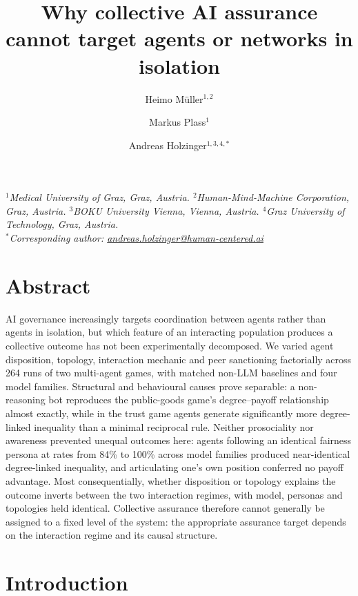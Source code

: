 \documentclass[11pt,a4paper]{article}
\title{\bfseries Why collective AI assurance cannot target agents or networks in isolation}
\author{Heimo M\"uller$^{1,2}$ \and Markus Plass$^{1}$ \and
Andreas Holzinger$^{1,3,4,*}$}
\date{}
\begin{document}
\maketitle

\noindent\textit{$^{1}$Medical University of Graz, Graz, Austria.
$^{2}$Human-Mind-Machine Corporation, Graz, Austria.
$^{3}$BOKU University Vienna, Vienna, Austria.
$^{4}$Graz University of Technology, Graz, Austria.\\
$^{*}$Corresponding author:
\href{mailto:andreas.holzinger@human-centered.ai}{andreas.holzinger@human-centered.ai}}
\vspace{1em}

\section*{Abstract}

AI governance increasingly targets coordination between agents rather
than agents in isolation, but which feature of an interacting
population produces a collective outcome has not been experimentally
decomposed. We varied
agent disposition, topology, interaction mechanic and peer sanctioning
factorially across 264 runs of two multi-agent games, with matched
non-LLM baselines and four model families. Structural and behavioural causes
prove separable: a non-reasoning bot reproduces the
public-goods game's degree--payoff relationship almost exactly, while
in the trust game agents generate significantly more degree-linked
inequality than a minimal reciprocal rule. Neither prosociality nor
awareness prevented unequal outcomes here: agents following an
identical fairness persona at rates from 84\% to 100\% across model
families produced
near-identical degree-linked inequality, and articulating one's own
position conferred no payoff advantage. Most consequentially, whether
disposition or topology explains the outcome inverts between the two
interaction regimes, with model, personas and topologies held
identical. Collective assurance therefore cannot generally be assigned
to a fixed level of the system: the appropriate assurance target
depends on the interaction regime and its causal structure.

\vspace{1em}

\section{Introduction}
\end{document}

